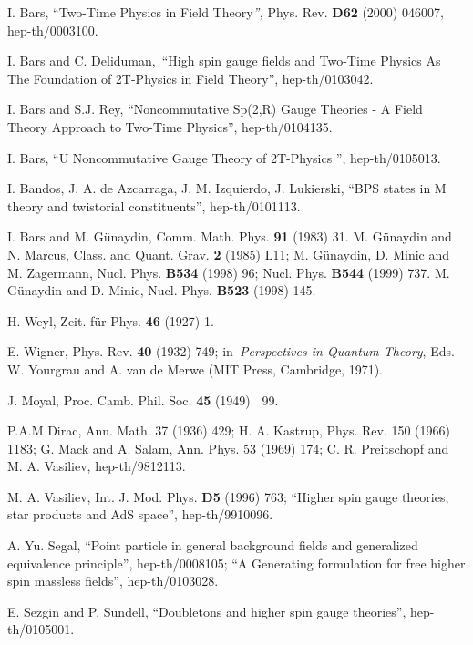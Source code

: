 \documentclass[a4paper,12pt]{article}
\begin{document}
\begin{thebibliography}{99}
  I. Bars, ``Two-Time Physics in Field Theory\textit{'', }
Phys. Rev. \textbf{D62} (2000) 046007, hep-th/0003100.

  I. Bars and C. Deliduman,\ ``High spin gauge fields and
Two-Time Physics As The Foundation of 2T-Physics in Field Theory'',
hep-th/0103042.

  I. Bars and S.J. Rey, ``Noncommutative Sp(2,R) Gauge
Theories - A Field Theory Approach to Two-Time Physics'', hep-th/0104135.

  I. Bars, ``U\coordHE{} Noncommutative
Gauge Theory of 2T-Physics '', hep-th/0105013.

  I. Bandos, J. A. de Azcarraga, J. M. Izquierdo, J.
Lukierski, ``BPS states in M theory and twistorial constituents'',
hep-th/0101113.

  I. Bars and M. G\"{u}naydin, Comm. Math. Phys.
\textbf{91 }(1983) 31. M. G\"{u}naydin and N. Marcus, Class. and Quant.
Grav. \textbf{2 }(1985) L11; M. G\"{u}naydin, D. Minic and M. Zagermann,
Nucl. Phys. \textbf{B534 }(1998) 96; Nucl. Phys. \textbf{B544 }(1999) 737.
M. G\"{u}naydin and D. Minic, Nucl. Phys. \textbf{B523 }(1998) 145.

  H. Weyl, Zeit. f\"ur Phys. \textbf{46} (1927) 1.

  E. Wigner, Phys. Rev. \textbf{40} (1932) 749; in\textit{\
Perspectives in Quantum Theory}, Eds. W. Yourgrau and A. van de Merwe (MIT
Press, Cambridge, 1971).

  J. Moyal, Proc. Camb. Phil. Soc. \textbf{45 }(1949)\textbf{%
\ }99.

  P.A.M Dirac, Ann. Math. 37 (1936) 429; H. A. Kastrup, Phys.
Rev. 150 (1966) 1183; G. Mack and A. Salam, Ann. Phys. 53 (1969) 174; C. R.
Preitschopf and M. A. Vasiliev, hep-th/9812113.

  M. A. Vasiliev, Int. J. Mod. Phys. \textbf{D5 }(1996) 763;
``Higher spin gauge theories, star products and AdS space'', hep-th/9910096.

  A. Yu. Segal, ``Point particle in general background fields
and generalized equivalence principle'', hep-th/0008105; ``A Generating
formulation for free higher spin massless fields'', hep-th/0103028.

  E. Sezgin and P. Sundell, ``Doubletons and higher spin
gauge theories'', hep-th/0105001.


\end{thebibliography}
\end{document}
